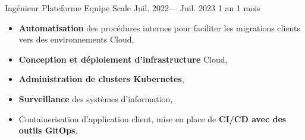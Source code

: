 \jobposition%
{Ingénieur Plateforme}%
{Equipe Scale}
{Juil. 2022--- Juil. 2023}%
{1 an 1 mois}%
{
	\begin{itemize}
		\item \textbf{Automatisation} des procédures internes pour faciliter les
		      migrations clients vers des environnements Cloud,
		\item \textbf{Conception et déploiement d'infrastructure} Cloud,
		\item \textbf{Administration de clusters Kubernetes},
		\item \textbf{Surveillance} des systèmes d'information,
		\item Containerisation d'application client, mise en place de
		      \textbf{CI/CD avec des outils GitOps},
	\end{itemize}
}
